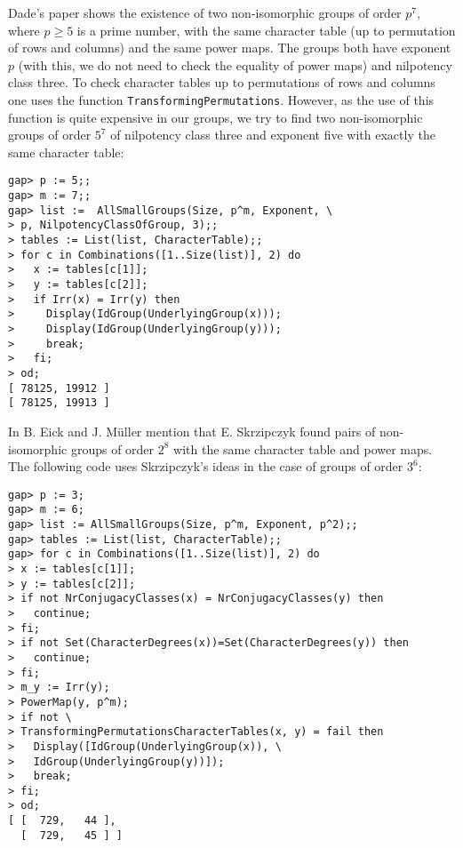 \begin{example}
    Dade's paper shows the existence of two non-isomorphic groups
    of order $p^7$, where $p\geq5$ is a prime number, 
    with the same character table (up to permutation of rows and columns) 
    and
    the same power maps. The groups 
    both have exponent $p$ (with this, we do not need to 
    check the equality 
    of power maps) 
    and nilpotency class three. 
    To check character tables up to permutations of rows and columns 
    one uses the function \lstinline{TransformingPermutations}. However, 
    as the use of this function is quite expensive 
    in our groups, we try to 
    find two non-isomorphic 
    groups of order $5^7$ of nilpotency class three
    and exponent five 
    with exactly the same character table:
\begin{lstlisting}
gap> p := 5;;
gap> m := 7;;
gap> list :=  AllSmallGroups(Size, p^m, Exponent, \ 
> p, NilpotencyClassOfGroup, 3);;
> tables := List(list, CharacterTable);;
> for c in Combinations([1..Size(list)], 2) do
>   x := tables[c[1]];
>   y := tables[c[2]];
>   if Irr(x) = Irr(y) then
>     Display(IdGroup(UnderlyingGroup(x)));
>     Display(IdGroup(UnderlyingGroup(y)));
>     break;
>   fi;
> od;
[ 78125, 19912 ]
[ 78125, 19913 ]
\end{lstlisting}
\end{example}

\begin{example}
    In \cite{MR2256391} B. Eick and J. M\"uller 
    mention that E. Skrzipczyk found pairs 
    of non-isomorphic 
    groups of order $2^8$ 
    with the same character table and 
    power maps. The following code
    uses Skrzipczyk's ideas in the case of  
    groups of order $3^6$:
\begin{lstlisting}
gap> p := 3;
gap> m := 6;
gap> list := AllSmallGroups(Size, p^m, Exponent, p^2);;
gap> tables := List(list, CharacterTable);;
gap> for c in Combinations([1..Size(list)], 2) do
> x := tables[c[1]];
> y := tables[c[2]];
> if not NrConjugacyClasses(x) = NrConjugacyClasses(y) then
>   continue;
> fi;
> if not Set(CharacterDegrees(x))=Set(CharacterDegrees(y)) then
>   continue;
> fi;
> m_y := Irr(y);
> PowerMap(y, p^m);
> if not \ 
> TransformingPermutationsCharacterTables(x, y) = fail then
>   Display([IdGroup(UnderlyingGroup(x)), \ 
>   IdGroup(UnderlyingGroup(y))]);
>   break;
> fi;
> od;
[ [  729,   44 ],
  [  729,   45 ] ]
\end{lstlisting}
\end{example}

